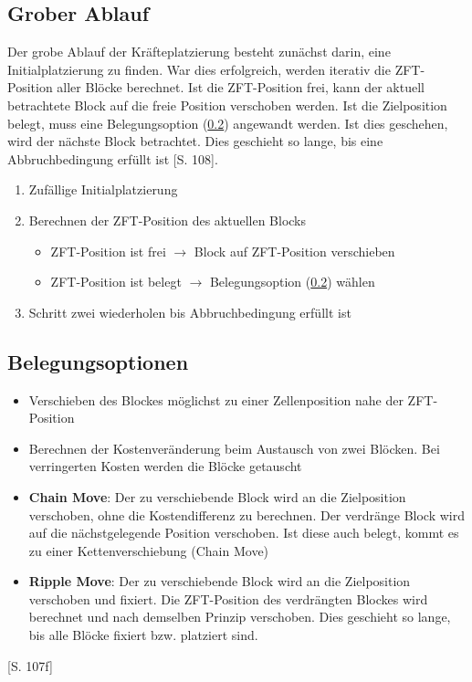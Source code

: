         \subsection{Grober Ablauf}
            Der grobe Ablauf der Kräfteplatzierung besteht zunächst darin, eine Initialplatzierung zu finden.
            War dies erfolgreich, werden iterativ die ZFT-Position aller Blöcke berechnet.
            Ist die ZFT-Position frei, kann der aktuell betrachtete Block auf die freie Position verschoben werden.
            Ist die Zielposition belegt, muss eine Belegungsoption (\ref{sec:beleungsoptionen}) angewandt werden.
            Ist dies geschehen, wird der nächste Block betrachtet.
            Dies geschieht so lange, bis eine Abbruchbedingung erfüllt ist \cite{layout}[S. 108].

            \begin{enumerate}
                \item Zufällige Initialplatzierung
                \item Berechnen der ZFT-Position des aktuellen Blocks
                        \begin{itemize}
                            \item ZFT-Position ist frei $\rightarrow$ Block auf ZFT-Position verschieben 
                            \item ZFT-Position ist belegt $\rightarrow$ Belegungsoption (\ref{sec:beleungsoptionen}) wählen
                        \end{itemize}
                \item Schritt zwei wiederholen bis Abbruchbedingung erfüllt ist
            \end{enumerate}

        \subsection{Belegungsoptionen}\label{sec:beleungsoptionen}
            \begin{itemize}
                \item Verschieben des Blockes möglichst zu einer Zellenposition nahe der ZFT-Position
                \item Berechnen der Kostenveränderung beim Austausch von zwei Blöcken. Bei verringerten Kosten werden die Blöcke getauscht
                \item \textbf{Chain Move}: Der zu verschiebende Block wird an die Zielposition verschoben,
                    ohne die Kostendifferenz zu berechnen. Der verdränge Block wird auf die nächstgelegende Position verschoben.
                    Ist diese auch belegt, kommt es zu einer Kettenverschiebung (Chain Move)
                \item \textbf{Ripple Move}: Der zu verschiebende Block wird an die Zielposition verschoben und fixiert.
                    Die ZFT-Position des verdrängten Blockes wird berechnet und nach demselben Prinzip verschoben.
                    Dies geschieht so lange, bis alle Blöcke fixiert bzw. platziert sind.
            \end{itemize}\cite{layout}[S. 107f]

            
            





       
        


